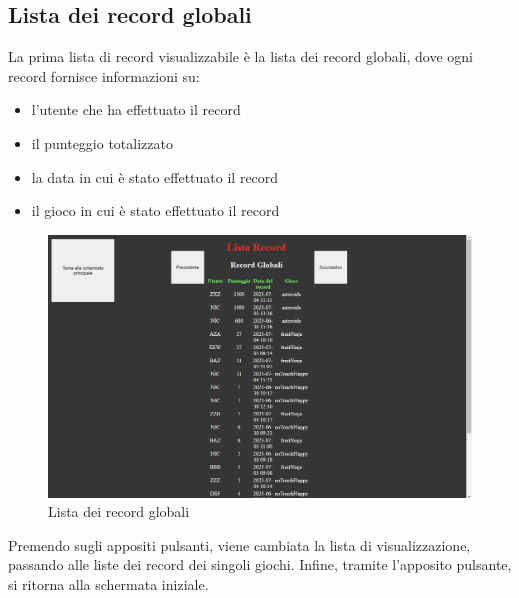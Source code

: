 \subsection{Lista dei record globali}
La prima lista di record visualizzabile è la lista dei record globali, dove ogni record fornisce informazioni su:
\begin{itemize}
    \item l'utente che ha effettuato il record
    \item il punteggio totalizzato
    \item la data in cui è stato effettuato il record
    \item il gioco in cui è stato effettuato il record
\end{itemize}
\begin{figure}[h]
    \centering
    \includegraphics[width=340pt]{schermataRecord.png}
    \caption{Lista dei record globali}
    \label{fig:schermataRecord}
\end{figure}
Premendo sugli appositi pulsanti, viene cambiata la lista di visualizzazione, passando alle liste dei record dei singoli giochi.
Infine, tramite l'apposito pulsante, si ritorna alla schermata iniziale.
